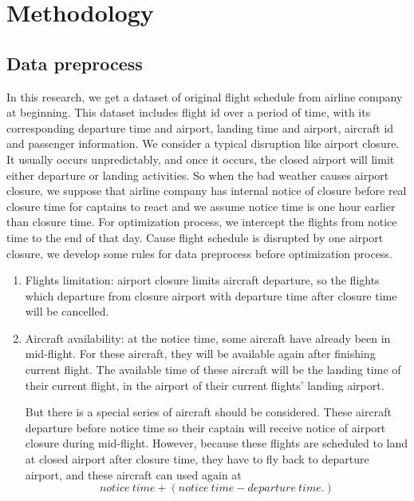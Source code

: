 \documentclass[senior]{IPSstyle}
\begin{document}
\chapter{Methodology} \label{methodology}

\section{Data preprocess}

In this research, we get a dataset of original flight schedule from airline company at beginning.
This dataset includes flight id over a period of time, with its corresponding departure time and airport, landing time and airport, aircraft id and passenger information.
We consider a typical disruption like airport closure. 
It usually occurs unpredictably, and once it occurs, the closed airport will limit either departure or landing activities.
So when the bad weather causes airport closure, we suppose that airline company has internal notice of closure before real closure time for captains to react and we assume notice time is one hour earlier than closure time.
For optimization process, we intercept the flights from notice time to the end of that day.
Cause flight schedule is disrupted by one airport closure, we develop some rules for data preprocess before optimization process.
\begin{enumerate}
    \item Flights limitation: airport closure limits aircraft departure, so the flights which departure from closure airport with departure time after closure time will be cancelled.
    \item Aircraft availability: at the notice time, some aircraft have already been in mid-flight. For these aircraft, they will be available again after finishing current flight. The available time of these aircraft will be the landing time of their current flight, in the airport of their current flights’ landing airport.
    
    But there is a special series of aircraft should be considered. These aircraft departure before notice time so their captain will receive notice of airport closure during mid-flight. However, because these flights are scheduled to land at closed airport after closure time, they have to fly back to departure airport, and these aircraft can used again at \begin{equation*}
    notice\  time+(notice\  time-departure\  time.)    
    \end{equation*}
\end{enumerate}
\end{document}
